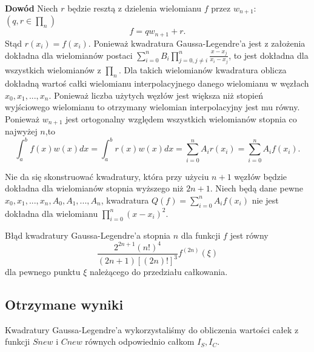 \documentclass{article}
\begin{document}
\textbf{Dowód} Niech $r$ będzie resztą z dzielenia wielomianu $f$ przez $w_{n+1}$: $(q,r\in \prod_{n})$\[f = qw_{n+1} + r .\] Stąd $r(x_i) = f(x_i)$. Ponieważ kwadratura Gaussa-Legendre'a jest z założenia dokładna dla wielomianów postaci $\sum_{i=0}^n B_i\prod_{j=0,j\neq i}^n \frac{x-x_j}{x_i-x_j}$, to jest dokładna dla wszystkich wielomianów z $\prod_n$. Dla takich wielomianów kwadratura oblicza dokładną wartoś całki wielomianu interpolacyjnego danego wielomianu w węzłach $x_0,x_1,...,x_n$. Ponieważ liczba użytych węzłów jest większa niż stopień wyjściowego wielomianu to otrzymany wielomian interpolacyjny jest mu równy. Ponieważ $w_{n+1}$ jest ortogonalny względem wszystkich wielomianów stopnia co najwyżej $n$,to \[\int_a^b f(x)w(x)dx = \int_a^b r(x)w(x)dx = \sum_{i=0}^n A_ir(x_i) = \sum_{i=0}^n A_if(x_i).\] 

Nie da się skonstruować kwadratury, która przy użyciu $n+1$ węzłów będzie dokładna dla wielomianów stopnia wyższego niż $2n+1$. Niech będą dane pewne $x_0,x_1,...,x_n,A_0,A_1,...,A_n$, kwadratura $Q(f) = \sum_{i=0}^n A_if(x_i)$ nie jest dokładna dla wielomianu $\prod_{i=0}^n (x-x_i)^2$. \newline

Błąd kwadratury Gaussa-Legendre'a stopnia $n$ dla funkcji $f$ jest równy \[
	\frac{2^{2n+1}(n!)^4}{(2n+1)[(2n)!]^3}f^{(2n)}(\xi) \]
dla pewnego punktu $\xi$ należącego do przedziału całkowania.

\subsection{Otrzymane wyniki}
	Kwadratury Gaussa-Legendre'a wykorzystaliśmy do obliczenia wartości całek z funkcji $Snew$ i $Cnew$ równych odpowiednio całkom $I_S,I_C$.
\end{document}
